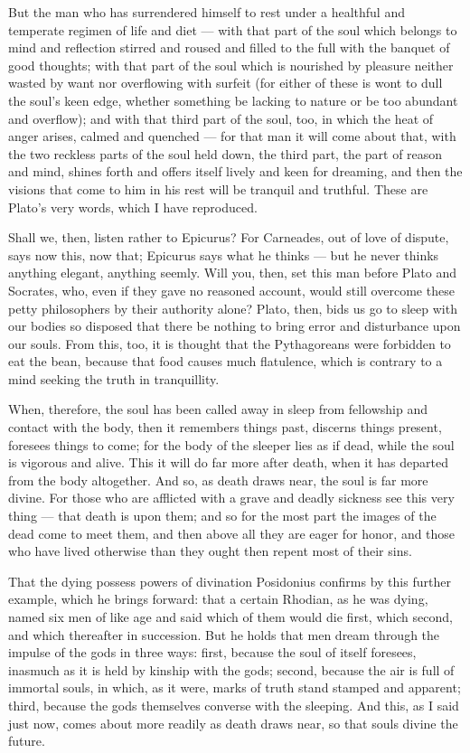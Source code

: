  But the man who has surrendered himself to rest under a healthful and temperate regimen of life and diet — with that part of the soul which belongs to mind and reflection stirred and roused and filled to the full with the banquet of good thoughts; with that part of the soul which is nourished by pleasure neither wasted by want nor overflowing with surfeit (for either of these is wont to dull the soul's keen edge, whether something be lacking to nature or be too abundant and overflow); and with that third part of the soul, too, in which the heat of anger arises, calmed and quenched — for that man it will come about that, with the two reckless parts of the soul held down, the third part, the part of reason and mind, shines forth and offers itself lively and keen for dreaming, and then the visions that come to him in his rest will be tranquil and truthful. These are Plato's very words, which I have reproduced.

 Shall we, then, listen rather to Epicurus? For Carneades, out of love of dispute, says now this, now that; Epicurus says what he thinks — but he never thinks anything elegant, anything seemly. Will you, then, set this man before Plato and Socrates, who, even if they gave no reasoned account, would still overcome these petty philosophers by their authority alone? Plato, then, bids us go to sleep with our bodies so disposed that there be nothing to bring error and disturbance upon our souls. From this, too, it is thought that the Pythagoreans were forbidden to eat the bean, because that food causes much flatulence, which is contrary to a mind seeking the truth in tranquillity.

 When, therefore, the soul has been called away in sleep from fellowship and contact with the body, then it remembers things past, discerns things present, foresees things to come; for the body of the sleeper lies as if dead, while the soul is vigorous and alive. This it will do far more after death, when it has departed from the body altogether. And so, as death draws near, the soul is far more divine. For those who are afflicted with a grave and deadly sickness see this very thing — that death is upon them; and so for the most part the images of the dead come to meet them, and then above all they are eager for honor, and those who have lived otherwise than they ought then repent most of their sins.

 That the dying possess powers of divination Posidonius confirms by this further example, which he brings forward: that a certain Rhodian, as he was dying, named six men of like age and said which of them would die first, which second, and which thereafter in succession. But he holds that men dream through the impulse of the gods in three ways: first, because the soul of itself foresees, inasmuch as it is held by kinship with the gods; second, because the air is full of immortal souls, in which, as it were, marks of truth stand stamped and apparent; third, because the gods themselves converse with the sleeping. And this, as I said just now, comes about more readily as death draws near, so that souls divine the future.


